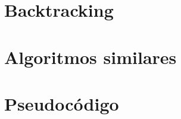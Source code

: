 \documentclass[a4paper,12pt]{article}
\begin{document}


\newpage
\section{Backtracking}





\section{Algoritmos similares}





\section{Pseudocódigo}
\end{document}
